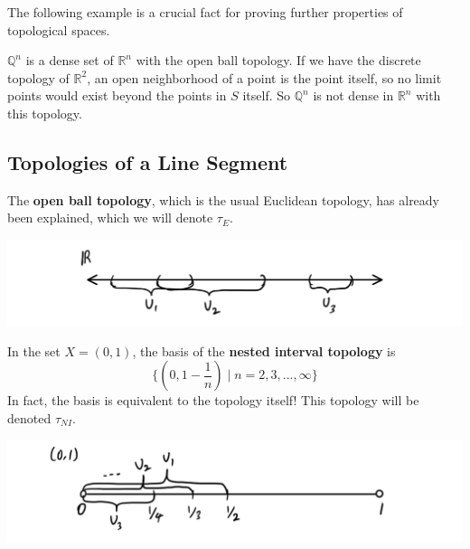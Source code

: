 \documentclass{article}
\begin{document}
    The following example is a crucial fact for proving further properties of topological spaces. 

    \begin{example}
    $\mathbb{Q}^{n}$ is a dense set of $\mathbb{R}^{n}$ with the open ball topology. If we have the discrete topology of $\mathbb{R}^{2}$, an open neighborhood of a point is the point itself, so no limit points would exist beyond the points in $S$ itself. So $\mathbb{Q}^{n}$ is not dense in $\mathbb{R}^{n}$ with this topology. 
    \end{example}

  \subsection{Topologies of a Line Segment}

    \begin{definition}
    The \textbf{open ball topology}, which is the usual Euclidean topology, has already been explained, which we will denote $\tau_{E}$. 
    \begin{center}
        \includegraphics[scale=0.25]{img/Open_Ball_Topology_on_Line.PNG}
    \end{center}
    \end{definition}

    \begin{definition}
    In the set $X = (0,1)$, the basis of the \textbf{nested interval topology} is 
    \[ \Big\{ (0, 1-\frac{1}{n}) \; | \; n = 2, 3, ..., \infty \Big\} \]
    In fact, the basis is equivalent to the topology itself! This topology will be denoted $\tau_{NI}$.
    \begin{center}
        \includegraphics[scale=0.25]{img/Nested_Interval_Topology.PNG}
    \end{center}
    \end{definition}
\end{document}
